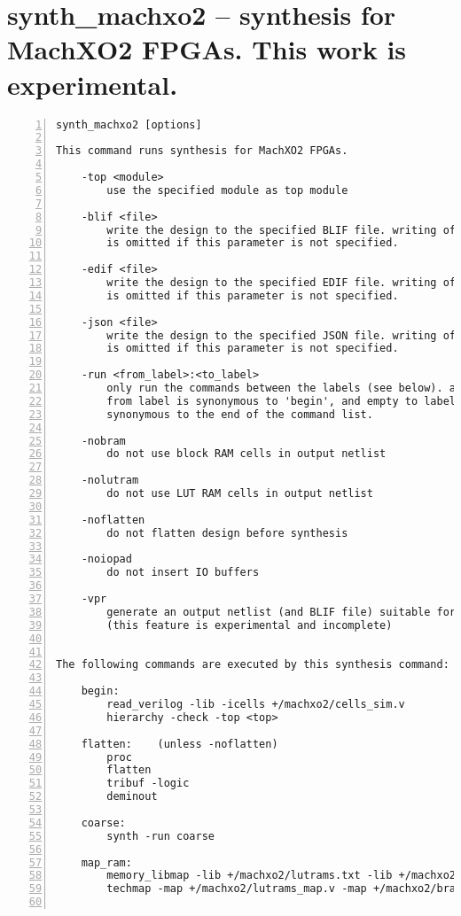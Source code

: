 \section{synth\_machxo2 -- synthesis for MachXO2 FPGAs. This work is experimental.}
\label{cmd:synth_machxo2}
\begin{lstlisting}[numbers=left,frame=single]
    synth_machxo2 [options]

This command runs synthesis for MachXO2 FPGAs.

    -top <module>
        use the specified module as top module

    -blif <file>
        write the design to the specified BLIF file. writing of an output file
        is omitted if this parameter is not specified.

    -edif <file>
        write the design to the specified EDIF file. writing of an output file
        is omitted if this parameter is not specified.

    -json <file>
        write the design to the specified JSON file. writing of an output file
        is omitted if this parameter is not specified.

    -run <from_label>:<to_label>
        only run the commands between the labels (see below). an empty
        from label is synonymous to 'begin', and empty to label is
        synonymous to the end of the command list.

    -nobram
        do not use block RAM cells in output netlist

    -nolutram
        do not use LUT RAM cells in output netlist

    -noflatten
        do not flatten design before synthesis

    -noiopad
        do not insert IO buffers

    -vpr
        generate an output netlist (and BLIF file) suitable for VPR
        (this feature is experimental and incomplete)


The following commands are executed by this synthesis command:

    begin:
        read_verilog -lib -icells +/machxo2/cells_sim.v
        hierarchy -check -top <top>

    flatten:    (unless -noflatten)
        proc
        flatten
        tribuf -logic
        deminout

    coarse:
        synth -run coarse

    map_ram:
        memory_libmap -lib +/machxo2/lutrams.txt -lib +/machxo2/brams.txt [-no-auto-block] [-no-auto-distributed]    (-no-auto-block if -nobram, -no-auto-distributed if -nolutram)
        techmap -map +/machxo2/lutrams_map.v -map +/machxo2/brams_map.v


\end{lstlisting}
